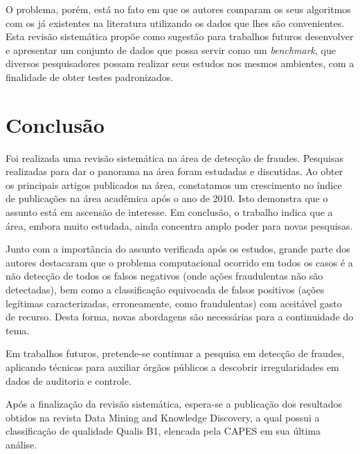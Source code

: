 \documentclass[smallextended]{svjour3}
\begin{document}
O problema, porém, está no fato em que os autores comparam os seus algoritmos com os já existentes na literatura utilizando os dados que lhes são convenientes. Esta revisão sistemática propõe como sugestão para trabalhos futuros desenvolver e apresentar um conjunto de dados que possa servir como um \emph{benchmark}, que diversos pesquisadores possam realizar seus estudos nos mesmos ambientes, com a finalidade de obter testes padronizados. 

\section{Conclusão}
\label{sec:6}

Foi realizada uma revisão sistemática na área de detecção de fraudes. Pesquisas realizadas para dar o panorama na área foram estudadas e discutidas. Ao obter os principais artigos publicados na área, constatamos um crescimento no índice de publicações na área acadêmica após o ano de 2010. Isto demonstra que o assunto está em ascensão de interesse. Em conclusão, o trabalho indica que a área, embora muito estudada, ainda concentra amplo poder para novas pesquisas.

Junto com a importância do assunto verificada após os estudos, grande parte dos autores destacaram que o problema computacional ocorrido em todos os casos é a não detecção de todos os falsos negativos (onde ações fraudulentas não são detectadas), bem como a classificação equivocada de falsos positivos (ações legítimas caracterizadas, erroneamente, como fraudulentas) com aceitável gasto de recurso. Desta forma, novas abordagens são necessárias para a continuidade do tema.

Em trabalhos futuros, pretende-se continuar a pesquisa em detecção de fraudes, aplicando técnicas para auxiliar órgãos públicos a descobrir irregularidades em dados de auditoria e controle.

Após a finalização da revisão sistemática, espera-se a publicação dos resultados obtidos na revista Data Mining and Knowledge Discovery, a qual possui a classificação de qualidade Qualis B1, elencada pela CAPES em sua última análise. 

	
	
	
\end{document}
